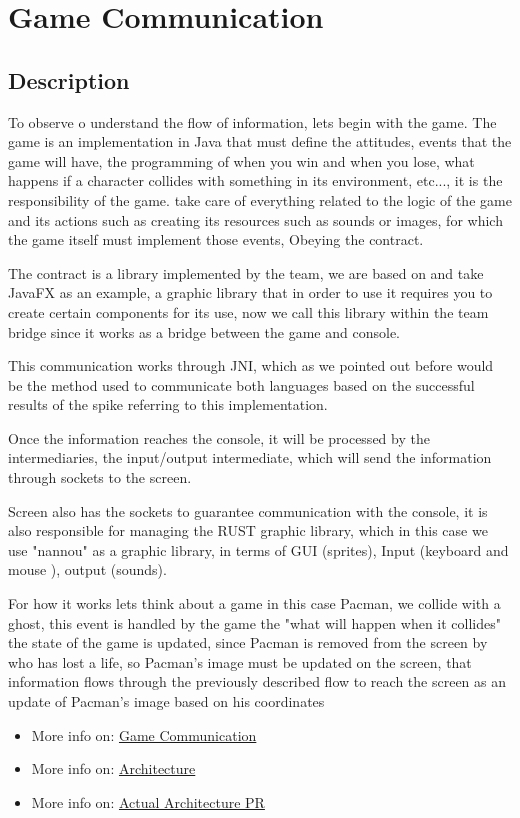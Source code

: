 \documentclass[a4paper,12pt]{article}
\begin{document}
\section{Game Communication}
\subsection{Description}
\setlength{\parskip}{1em}
To observe o understand the flow of information, lets begin with the game.
The game is an implementation in Java that must define the attitudes, events that the game will have, the programming of when you win and when you lose, what happens if a character collides with something in its environment, etc..., it is the responsibility of the game. take care of everything related to the logic of the game and its actions such as creating its resources such as sounds or images, for which the game itself must implement those events, Obeying the contract.


The contract is a library implemented by the team, we are based on and take JavaFX as an example, a graphic library that in order to use it requires you to create certain components for its use, now we call this library within the team bridge since it works as a bridge between the game and console.


This communication works through JNI, which as we pointed out before would be the method used to communicate both languages based on the successful results of the spike referring to this implementation.


Once the information reaches the console, it will be processed by the intermediaries, the input/output intermediate, which will send the information through sockets to the screen.


Screen also has the sockets to guarantee communication with the console, it is also responsible for managing the RUST graphic library, which in this case we use "nannou" as a graphic library, in terms of GUI (sprites), Input (keyboard and mouse ), output (sounds).


For how it works lets think about a game in this case Pacman, we collide with a ghost, this event is handled by the game the "what will happen when it collides" the state of the game is updated, since Pacman is removed from the screen by who has lost a life, so Pacman's image must be updated on the screen, that information flows through the previously described flow to reach the screen as an update of Pacman's image based on his coordinates
\begin{itemize}
    \item More info on:  \href{https://tree.taiga.io/project/joseluis-teran-coffeetime/wiki/game-communication}{Game Communication}
      \item More info on:  \href{https://github.com/Pending-Name-21/arquitecture/blob/main/workspace.dsl}{Architecture} 
      \item More info on:  \href{https://github.com/Pending-Name-21/arquitecture/pull/12}{Actual Architecture PR} 
\end{itemize}
\end{document}
